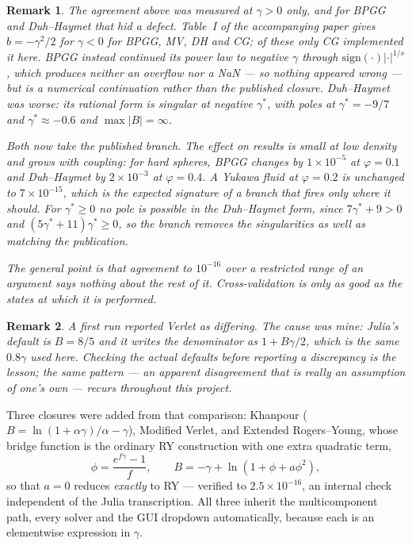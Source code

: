 \documentclass[11pt,a4paper]{article}
\newtheorem{remark}{Remark}
\begin{document}
\begin{remark}
The agreement above was measured at $\gamma > 0$ only, and for BPGG and
Duh--Haymet that hid a defect. Table~I of the accompanying paper gives
$b = -\gamma^2/2$ for $\gamma < 0$ for BPGG, MV, DH and CG; of these only CG
implemented it here. BPGG instead continued its power law to negative
$\gamma$ through $\mathrm{sign}(\cdot)|\cdot|^{1/s}$, which produces neither
an overflow nor a NaN --- so nothing appeared wrong --- but is a numerical
continuation rather than the published closure. Duh--Haymet was worse: its
rational form is singular at negative $\gamma^*$, with poles at
$\gamma^* = -9/7$ and $\gamma^* \approx -0.6$ and $\max|B| = \infty$.

Both now take the published branch. The effect on results is small at low
density and grows with coupling: for hard spheres, BPGG changes by
$1\times10^{-5}$ at $\varphi = 0.1$ and Duh--Haymet by $2\times10^{-3}$ at
$\varphi = 0.4$. A Yukawa fluid at $\varphi = 0.2$ is unchanged to
$7\times10^{-15}$, which is the expected signature of a branch that fires
only where it should. For $\gamma^* \ge 0$ no pole is possible in the
Duh--Haymet form, since $7\gamma^*+9 > 0$ and $(5\gamma^*+11)\gamma^* \ge 0$,
so the branch removes the singularities as well as matching the publication.

The general point is that agreement to $10^{-16}$ over a restricted range of
an argument says nothing about the rest of it. Cross-validation is only as
good as the states at which it is performed.
\end{remark}

\begin{remark}
A first run reported Verlet as differing. The cause was mine: Julia's default
is $B=8/5$ and it writes the denominator as $1+B\gamma/2$, which is the same
$0.8\gamma$ used here. Checking the actual defaults before reporting a
discrepancy is the lesson; the same pattern --- an apparent disagreement that
is really an assumption of one's own --- recurs throughout this project.
\end{remark}

Three closures were added from that comparison: Khanpour
($B=\ln(1+\alpha\gamma)/\alpha-\gamma$), Modified Verlet, and Extended
Rogers--Young, whose bridge function is the ordinary RY construction with one
extra quadratic term,
\begin{equation}
\phi=\frac{e^{f\gamma}-1}{f},
\qquad
B=-\gamma+\ln\!\left(1+\phi+a\phi^2\right),
\end{equation}
so that $a=0$ reduces \emph{exactly} to RY --- verified to
$2.5\times10^{-16}$, an internal check independent of the Julia transcription.
All three inherit the multicomponent path, every solver and the GUI dropdown
automatically, because each is an elementwise expression in $\gamma$.
\end{document}
